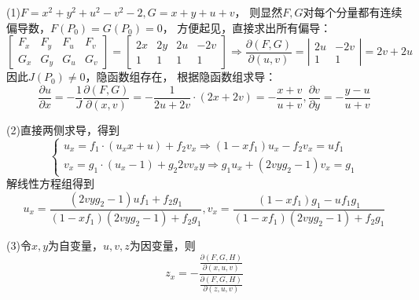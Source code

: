 \begin{solution}
  (1)$F = x^2 + y^2 + u^2 - v^2 - 2, G = x+y+u+v$，
  则显然$F,G$对每个分量都有连续偏导数，$F(P_0) = G(P_0) = 0$，
  方便起见，直接求出所有偏导：
  \begin{equation*}
    \left[
      \begin{array}{cccc}
        F_x&F_y&F_u&F_v \\
           G_x&G_y&G_u&G_v
      \end{array}
    \right] = \left[
      \begin{array}{cccc}
        2x&2y&2u&-2v \\
          1&1&1&1
      \end{array}
    \right] \Rightarrow \frac{\partial(F,G)}{\partial(u,v)} = \left|
      \begin{array}{cc}
        2u&-2v \\
          1&1
      \end{array}
    \right| = 2v + 2u
  \end{equation*}
  因此$J(P_0) \neq 0$，隐函数组存在，
  根据隐函数组求导：
  \begin{equation*}
    \frac{\partial u}{\partial x} = - \frac{1}{J} \frac{\partial(F,G)}{\partial(x,v)} = - \frac{1}{2u+2v} \cdot(2x + 2v) = - \frac{x+v}{u+v},
    \frac{\partial v}{\partial y} = - \frac{y - u}{u + v}
  \end{equation*}

  (2)直接两侧求导，得到
  \begin{equation*}
    \begin{cases}
      u_x = f_1\cdot(u_xx + u) + f_2v_x \Rightarrow (1 - xf_1)u_x - f_2 v_x = uf_1\\
      v_x = g_1\cdot (u_x - 1) + g_2 2vv_xy \Rightarrow g_1u_x + (2vyg_2 - 1)v_x = g_1
    \end{cases}
  \end{equation*}
  解线性方程组得到
  \begin{equation*}
    u_x = \frac{(2vyg_2 - 1)uf_1 + f_2g_1}{(1 - xf_1)(2vyg_2 - 1)+f_2g_1}, v_x = \frac{(1 - xf_1)g_1 - uf_1g_1}{(1 - xf_1)(2vyg_2 - 1) + f_2g_1}
  \end{equation*}

  (3)令$x,y$为自变量，$u,v,z$为因变量，则
  \begin{equation*}
    z_x = -\frac{ \frac{\partial(F,G,H)}{\partial(x,u,v)}}{\frac{\partial(F,G,H)}{\partial(z,u,v)}}
  \end{equation*}
\end{solution}

